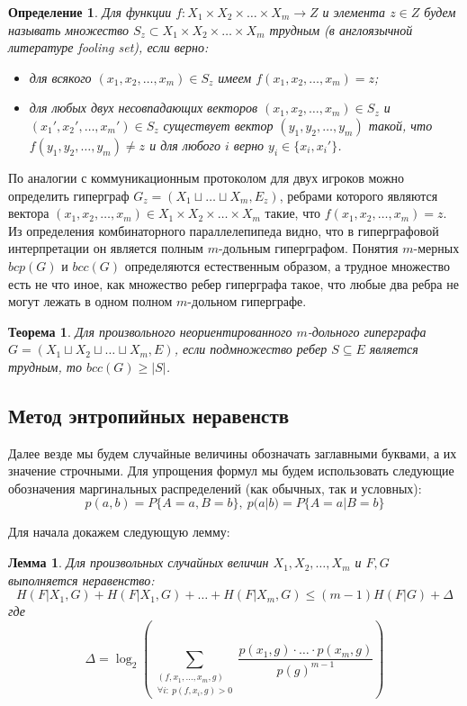 \documentclass[a4paper]{article}
\newtheorem*{mdefinition}{Определение}
\newtheorem{mtheorem}{Теорема}[section]
\newtheorem{mlemma}{Лемма}[section]
\begin{document}
\begin{mdefinition}
	Для функции $f: X_1\times X_2\times\ldots\times X_m \rightarrow Z$ и элемента $z\in Z$ будем называть множество 
	$S_z\subset X_1\times X_2\times\ldots\times X_m$ трудным (в англоязычной литературе fooling set), если верно:
	\begin{itemize}[noitemsep]
		\item для всякого $(x_1, x_2, \ldots, x_m)\in S_z$ имеем $f(x_1, x_2, \ldots, x_m) = z$;
		\item для любых двух несовпадающих векторов $(x_1, x_2,\ldots, x_m)\in S_z$ и $(x_1', x_2',\ldots, x_m')\in S_z$ 
		существует вектор $(y_1, y_2,\ldots, y_m)$ такой, что $f(y_1, y_2,\ldots, y_m) \neq z$ и для любого 
		$i$ верно $y_i \in \{x_i, x_i'\}$.
	\end{itemize}
\end{mdefinition}

По аналогии с коммуникационным протоколом для двух игроков можно определить гиперграф 
$G_z = (X_1\sqcup\ldots\sqcup X_m, E_z)$, ребрами которого являются вектора $(x_1, x_2,\ldots, x_m) 
\in X_1\times X_2\times\ldots\times X_m$ такие, что $f(x_1, x_2,\ldots, x_m) = z$. Из определения 
комбинаторного параллелепипеда видно, что в гиперграфовой интерпретации он является полным $m$-дольным 
гиперграфом. Понятия $m$-мерных $bcp(G)$ и $bcc(G)$ определяются естественным образом, а трудное множество есть 
не что иное, как множество ребер гиперграфа такое, что любые два ребра не могут лежать в одном полном $m$-дольном гиперграфе.  
	
\begin{mtheorem}
    Для произвольного неориентированного $m$-дольного гиперграфа $G = (X_1\sqcup X_2\sqcup\ldots\sqcup X_m, E)$, 
    если подмножество ребер $S \subseteq E$ является трудным, то $bcc(G) \geq |S|$.
\end{mtheorem}

\subsection{Метод энтропийных неравенств}

Далее везде мы будем случайные величины обозначать заглавными буквами, а их значение строчными. Для упрощения 
формул мы будем использовать следующие обозначения маргинальных распределений (как обычных, так и условных):
$$p(a,b) = P\{A=a, B=b\},\ p(a|b) = P\{A=a | B=b\}$$

Для начала докажем следующую лемму:
\begin{mlemma}
    Для произвольных случайных величин $X_1, X_2,\ldots, X_m$ и $F, G$ выполняется неравенство:
    $$H(F|X_1,G) + H(F|X_1,G) + \ldots + H(F|X_m,G) \leq (m-1)H(F|G) + \Delta$$ где 
    $$\Delta = \log_2\left(\sum\limits_{\substack{(f,x_1,\ldots,x_m,g) \\ \forall i:\ p(f,x_i,g)>0}}\frac{p(x_1,g)\cdot\ldots\cdot p(x_m,g)}{p(g)^{m-1}}\right)$$
\end{mlemma}
\end{document}
